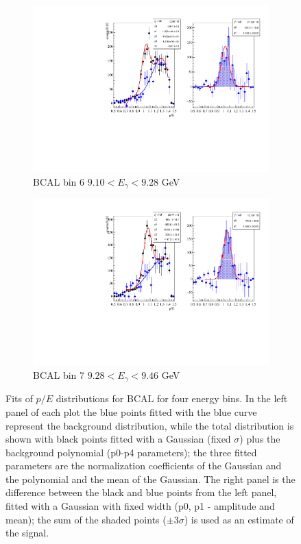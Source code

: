\documentclass[%
preprint,
nofootinbib,
 amsmath,amssymb,
 aps,
floatfix,
]{revtex4-1}
\begin{document}
\begin{figure}[h]
\begin{subfigure}[b]{0.49\textwidth}
    \includegraphics[width=\textwidth]{./fig/AN2_PovE_BCAL_bin6.pdf}
    \caption{BCAL bin 6 $9.10<E_\gamma <9.28$ GeV }
    \label{fig:BCALbin6}
  \end{subfigure}
  \begin{subfigure}[b]{0.49\textwidth}
    \includegraphics[width=\textwidth]{./fig/AN2_PovE_BCAL_bin7.pdf}
    \caption{BCAL bin 7 $9.28<E_\gamma <9.46$ GeV}
    \label{fig:BCALbin7}
  \end{subfigure}
  \caption{
Fits of $p/E$ distributions for BCAL for four energy bins.
In the left panel of each plot the blue points fitted with the blue curve represent the
background distribution, while the total distribution is shown with black points
fitted with a Gaussian (fixed $\sigma $) plus the background polynomial (p0-p4 parameters);
the three fitted parameters are the normalization coefficients of the Gaussian and the polynomial and the mean of the Gaussian.
The right panel is the difference between the black and blue points from the left panel,
fitted with a Gaussian with fixed width (p0, p1 - amplitude and mean); the sum of the shaded points ($\pm 3\sigma $)
is used as an estimate of the signal.
}\label{fig:BCALbin47}
\end{figure}
\end{document}
